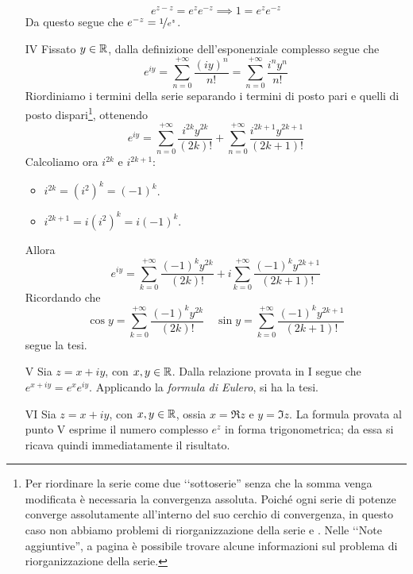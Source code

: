 \begin{demonstration}
\begin{enumerate}[label=\Roman*]
\begin{equation*}
	e^{z-z}  = e^{z}e^{-z}\implies 1 = e^{z}e^{-z}
\end{equation*}
Da questo segue che $e^{-z} = \nicefrac{1}{e^z}$.
\item[IV] Fissato $y\in\mathbb{R}$, dalla definizione dell'esponenziale complesso segue che
\begin{equation*}
	e^{iy}=\sum_{n=0}^{+\infty}\frac{\left(iy\right)^n}{n!}=\sum_{n=0}^{+\infty}\frac{i^ny^n}{n!}
\end{equation*}
Riordiniamo i termini della serie separando i termini di posto pari e quelli di posto dispari\footnote{Per riordinare la serie come due ‘‘sottoserie'' senza che la somma venga modificata è necessaria la convergenza assoluta. Poiché ogni serie di potenze converge assolutamente all'interno del suo cerchio di convergenza, in questo caso non abbiamo problemi di riorganizzazione della serie e . Nelle ‘‘Note aggiuntive'', a pagina \pageref{riordinamentoserie} è possibile trovare alcune informazioni sul problema di riorganizzazione della serie.}, ottenendo
\begin{equation*}
	e^{iy}=\sum_{n=0}^{+\infty}\frac{i^{2k}y^{2k}}{\left(2k\right)!}+\sum_{n=0}^{+\infty}\frac{i^{2k+1}y^{2k+1}}{\left(2k+1\right)!}
\end{equation*}
Calcoliamo ora $i^{2k}$ e $i^{2k+1}$:
\begin{itemize}
	\item $i^{2k}=\left(i^2\right)^k=\left(-1\right)^k$.
	\item $i^{2k+1}=i\left(i^2\right)^k=i\left(-1\right)^k$.
\end{itemize}
Allora
\begin{equation*}
	e^{iy}=\sum_{k=0}^{+\infty}\frac{\left(-1\right)^ky^{2k}}{\left(2k\right)!}+i\sum_{k=0}^{+\infty}\frac{\left(-1\right)^ky^{2k+1}}{\left(2k+1\right)!}
\end{equation*}
Ricordando che
\begin{equation*}
	\cos y=\sum_{k=0}^{+\infty}\frac{\left(-1\right)^ky^{2k}}{\left(2k\right)!}\quad
	\sin y=\sum_{k=0}^{+\infty}\frac{\left(-1\right)^ky^{2k+1}}{\left(2k+1\right)!}
\end{equation*}
segue la tesi.
\item[V] Sia $z=x+iy$, con $x,y\in\mathbb{R}$. Dalla relazione provata in I segue che $e^{x+iy}=e^xe^{iy}$. Applicando la \textit{formula di Eulero}, si ha la tesi.
\item[VI] Sia $z=x+iy$, con $x,y\in \mathbb{R}$, ossia $x=\Re z$ e $y=\Im z$. 
La formula provata al punto V esprime il numero complesso $e^z$ in forma trigonometrica; da essa si ricava quindi immediatamente il risultato.

\end{enumerate}
\end{demonstration}
